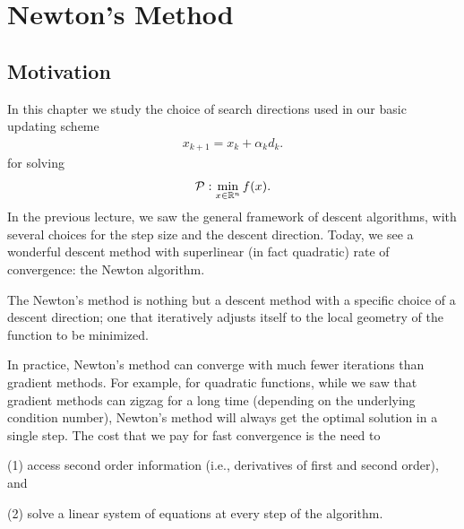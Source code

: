 \chapter{Newton's Method}\label{chp:Newton Method}

\section{Motivation}




In this chapter we study the choice of search directions used in our basic updating scheme
\begin{align*}
    x_{k+1} = x_k +\alpha_k d_k. 
\end{align*}
for solving
\begin{align*}
    \mathcal{P}:\min_{x\in\mathbb{R}^n} f(x).
\end{align*}
In the previous lecture, we saw the general framework of descent
algorithms, with several choices for the step size and the descent
direction. Today, we see a wonderful descent method with superlinear (in fact
quadratic) rate of convergence: the Newton algorithm.
\par 
The Newton's method is nothing but a descent method with a specific
choice of a descent direction; one that iteratively adjusts itself to the local
geometry of the function to be minimized.
\par
In practice, Newton's method can converge with much fewer iterations
than gradient methods. For example, for quadratic functions, while we
saw that gradient methods can zigzag for a long time (depending on the
underlying condition number), Newton's method will always get the
optimal solution in a single step. The cost that we pay for fast convergence is the need to 
\par
(1) access second order information (i.e., derivatives of first and second order), and 
\par
(2) solve a linear system of equations at every step of the algorithm.

